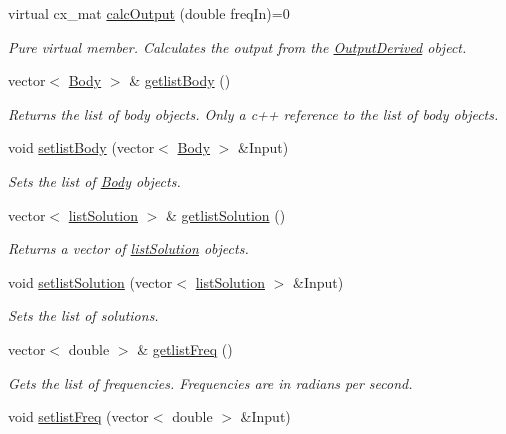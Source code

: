 \begin{DoxyCompactItemize}
virtual cx\-\_\-mat \hyperlink{class_output_derived_a7a65864e45519edfe7fe45c408457f41}{calc\-Output} (double freq\-In)=0
\begin{DoxyCompactList}\small\item\em Pure virtual member. Calculates the output from the \hyperlink{class_output_derived}{Output\-Derived} object. \end{DoxyCompactList}\item 
vector$<$ \hyperlink{class_body}{Body} $>$ \& \hyperlink{class_output_derived_ac6a77d28934026f473f89cc65126d95c}{getlist\-Body} ()
\begin{DoxyCompactList}\small\item\em Returns the list of body objects. Only a c++ reference to the list of body objects. \end{DoxyCompactList}\item 
void \hyperlink{class_output_derived_a261f8d51928fa5aa497cfe8ccd47fb16}{setlist\-Body} (vector$<$ \hyperlink{class_body}{Body} $>$ \&Input)
\begin{DoxyCompactList}\small\item\em Sets the list of \hyperlink{class_body}{Body} objects. \end{DoxyCompactList}\item 
vector$<$ \hyperlink{classlist_solution}{list\-Solution} $>$ \& \hyperlink{class_output_derived_a49a581a23397a24893db0990d3b67bfa}{getlist\-Solution} ()
\begin{DoxyCompactList}\small\item\em Returns a vector of \hyperlink{classlist_solution}{list\-Solution} objects. \end{DoxyCompactList}\item 
void \hyperlink{class_output_derived_a6689e121641bb37ddb1620416b7ccd3c}{setlist\-Solution} (vector$<$ \hyperlink{classlist_solution}{list\-Solution} $>$ \&Input)
\begin{DoxyCompactList}\small\item\em Sets the list of solutions. \end{DoxyCompactList}\item 
vector$<$ double $>$ \& \hyperlink{class_output_derived_a355046fc651296105375693479d57687}{getlist\-Freq} ()
\begin{DoxyCompactList}\small\item\em Gets the list of frequencies. Frequencies are in radians per second. \end{DoxyCompactList}\item 
void \hyperlink{class_output_derived_a0d7ed0123c1af843d2c257630e26595e}{setlist\-Freq} (vector$<$ double $>$ \&Input)

\end{DoxyCompactItemize}
